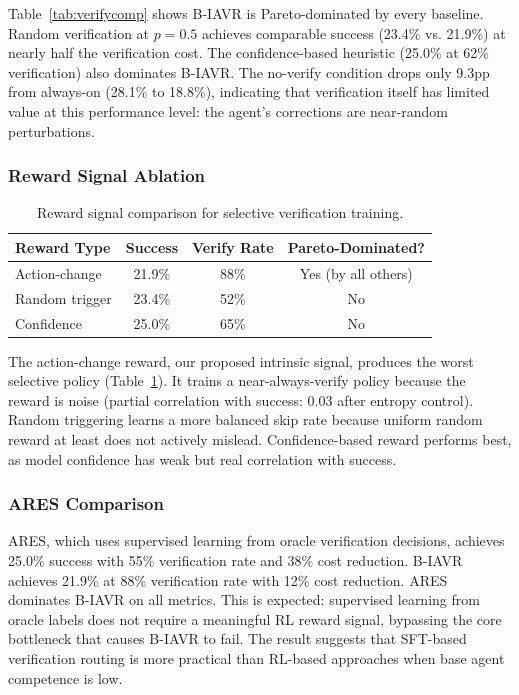 \documentclass[11pt]{article}
\begin{document}
Table~\ref{tab:verifycomp} shows B-IAVR is Pareto-dominated by every baseline.
Random verification at $p{=}0.5$ achieves comparable success (23.4\% vs. 21.9\%) at nearly half the verification cost.
The confidence-based heuristic (25.0\% at 62\% verification) also dominates B-IAVR.
The no-verify condition drops only 9.3pp from always-on (28.1\% to 18.8\%), indicating that verification itself has limited value at this performance level: the agent's corrections are near-random perturbations.

\subsubsection{Reward Signal Ablation}

\begin{table}[h]
\centering
\caption{Reward signal comparison for selective verification training.}
\label{tab:rewardablation}
\begin{tabular}{lccc}
\toprule
Reward Type & Success & Verify Rate & Pareto-Dominated? \\
\midrule
Action-change  & 21.9\% & 88\% & Yes (by all others) \\
Random trigger & 23.4\% & 52\% & No \\
Confidence     & 25.0\% & 65\% & No \\
\bottomrule
\end{tabular}
\end{table}

The action-change reward, our proposed intrinsic signal, produces the worst selective policy (Table~\ref{tab:rewardablation}).
It trains a near-always-verify policy because the reward is noise (partial correlation with success: 0.03 after entropy control).
Random triggering learns a more balanced skip rate because uniform random reward at least does not actively mislead.
Confidence-based reward performs best, as model confidence has weak but real correlation with success.

\subsubsection{ARES Comparison}

ARES, which uses supervised learning from oracle verification decisions, achieves 25.0\% success with 55\% verification rate and 38\% cost reduction.
B-IAVR achieves 21.9\% at 88\% verification rate with 12\% cost reduction.
ARES dominates B-IAVR on all metrics.
This is expected: supervised learning from oracle labels does not require a meaningful RL reward signal, bypassing the core bottleneck that causes B-IAVR to fail.
The result suggests that SFT-based verification routing is more practical than RL-based approaches when base agent competence is low.
\end{document}

